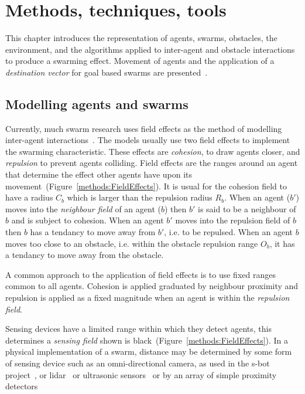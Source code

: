 \chapter{Methods, techniques, tools}\label{chapter:methods}
This chapter introduces the representation of agents, swarms, obstacles, the environment, and the algorithms applied to inter-agent and obstacle interactions to produce a swarming effect. Movement of agents and the application of a \textit{destination vector} for goal based swarms are presented~\cite{MP:10}. 

\section{Modelling agents and swarms}
Currently, much swarm research uses field effects as the method of modelling inter-agent interactions~\cite{BAF:06, BAFVM:06, BM:09, APZDAMC:09, GP:02, GP:04, GP:04a, GP:05, GP:11, MYP:09}. The models usually use two field effects to implement the swarming characteristic. These effects are \textit{cohesion}, to draw agents closer, and \textit{repulsion} to prevent agents colliding. Field effects are the ranges around an agent that determine the effect other agents have upon its movement~(Figure~\ref{methods:FieldEffects}). It is usual for the cohesion field to have a radius $C_b$ which is larger than the repulsion radius $R_b$. When an agent ($b'$) moves into the \textit{neighbour field} of an agent ($b$) then $b'$ is said to be a neighbour of $b$ and is subject to cohesion. When an agent $b'$ moves into the repulsion field of $b$ then $b$ has a tendancy to move away from $b'$, i.e. to be repulsed. When an agent $b$ moves too close to an obstacle, i.e. within the obstacle repulsion range $O_b$, it has a tendancy to move away from the obstacle. 

A common approach to the application of field effects is to use fixed ranges common to all agents. Cohesion is applied graduated by neighbour proximity and repulsion is applied as a fixed magnitude when an agent is within the \textit{repulsion field}. 

Sensing devices have a limited range within which they detect agents, this determines a \textit{sensing field} shown is black~(Figure~\ref{methods:FieldEffects}). In a physical implementation of a swarm, distance may be determined by some form of sensing device such as an omni-directional camera, as used in the s-bot project~\cite{HR:ND,MFGAB:03,MIN:07}, or lidar~\cite{LJLYP:15} or ultrasonic sensors~\cite{BC:15} or by an array of simple proximity detectors~\cite{HWN:11}  

